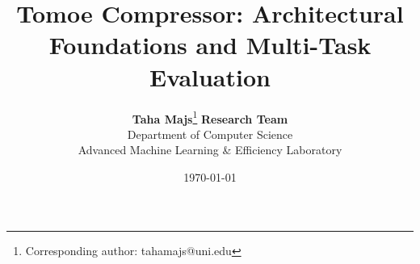 \title{\textbf{Tomoe Compressor: Architectural Foundations and Multi-Task Evaluation}}

\author{
  \textbf{Taha Majs}\thanks{Corresponding author: tahamajs@uni.edu} \quad \textbf{Research Team} \\
  Department of Computer Science \\
  Advanced Machine Learning \& Efficiency Laboratory
}

\date{\today}
